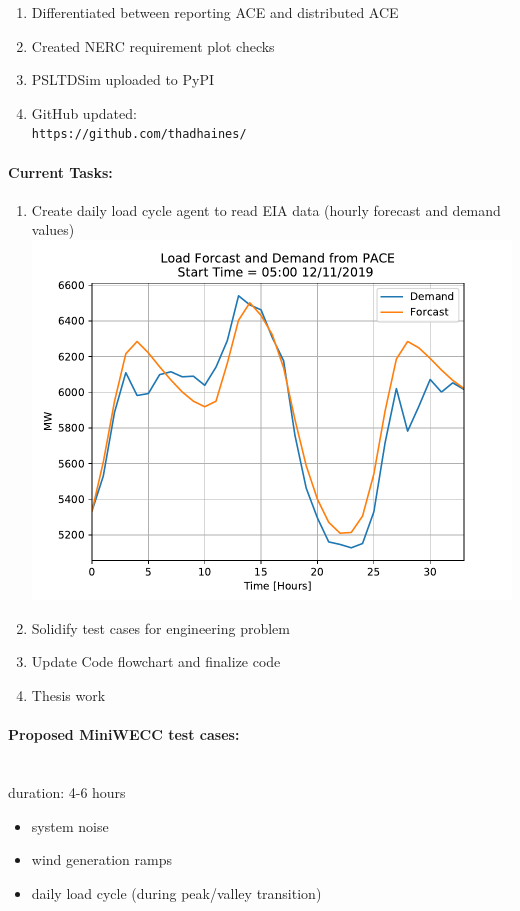 \documentclass[12pt]{article}
\begin{document}
\begin{multicols}{2}
\begin{enumerate}
\item Differentiated between reporting ACE and distributed ACE
\item Created NERC requirement plot checks
\item PSLTDSim uploaded to PyPI
		\item GitHub updated:\\
		\verb|https://github.com/thadhaines/|


\vfill\null
\columnbreak
	
	\end{enumerate}
\paragraph{Current Tasks:}
	\begin{enumerate}
		\itemsep0em 
\item Create daily load cycle agent to read EIA data (hourly forecast and demand values)
\includegraphics[width=\linewidth]{figures/scheduler}%
		\item Solidify test cases for engineering problem
		\item Update Code flowchart and finalize code%
		\item Thesis work 
\end{enumerate}
\paragraph{Proposed MiniWECC test cases:} \ \\
duration: 4-6 hours
\begin{itemize}
	\itemsep0em 
\item system noise 
\item wind generation ramps 
\item daily load cycle (during peak/valley transition)
\end{itemize}


\end{multicols}
\end{document}
